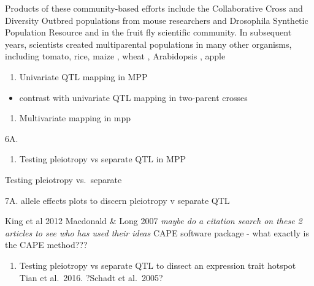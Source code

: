 \documentclass[]{article}
\providecommand{\tightlist}{%
  \setlength{\itemsep}{0pt}\setlength{\parskip}{0pt}}
\begin{document}
Products of these community-based efforts include the Collaborative
Cross and Diversity Outbred populations from mouse researchers and
Drosophila Synthetic Population Resource \citep{king2012genetic} and  in the fruit fly
scientific community. In subsequent years, scientists created
multiparental populations in many other organisms, including tomato, rice, maize \citep{lehermeier2014usefulness}, wheat \citep{mackay2014eight, huang2012multiparent, milner2016multiparental}, Arabidopsis \citep{}, apple \citep{allard2016detecting}

\begin{enumerate}
\def\labelenumi{\arabic{enumi}.}
\setcounter{enumi}{4}
\tightlist
\item
  Univariate QTL mapping in MPP
\end{enumerate}

\begin{itemize}
\tightlist
\item
  contrast with univariate QTL mapping in two-parent crosses
\end{itemize}

\begin{enumerate}
\def\labelenumi{\arabic{enumi}.}
\setcounter{enumi}{5}
\tightlist
\item
  Multivariate mapping in mpp
\end{enumerate}

6A.

\begin{enumerate}
\def\labelenumi{\arabic{enumi}.}
\setcounter{enumi}{6}
\tightlist
\item
  Testing pleiotropy vs separate QTL in MPP
\end{enumerate}

Testing pleiotropy vs.~separate

7A. allele effects plots to discern pleiotropy v separate QTL

King et al 2012 Macdonald \& Long 2007 \emph{maybe do a citation search
on these 2 articles to see who has used their ideas} CAPE software
package - what exactly is the CAPE method???

\begin{enumerate}
\def\labelenumi{\arabic{enumi}.}
\setcounter{enumi}{7}
\tightlist
\item
  Testing pleiotropy vs separate QTL to dissect an expression trait
  hotspot Tian et al.~2016. ?Schadt et al.~2005?
\end{enumerate}
\end{document}
